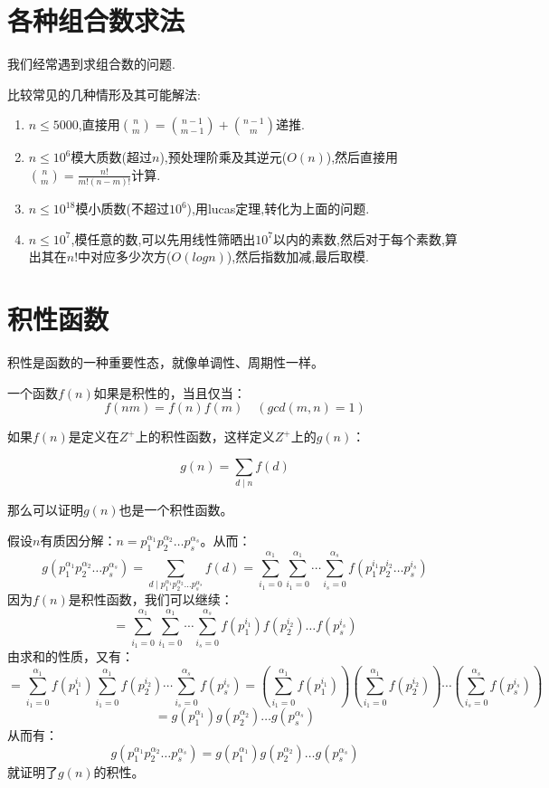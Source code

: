 \documentclass{beamer}
\begin{document}
	\section{各种组合数求法}
		\begin{frame}
			我们经常遇到求组合数的问题.
			
			\pause
			
			比较常见的几种情形及其可能解法:
			\begin{enumerate}
				\item $n \leq 5000$,直接用$\binom{n}{m} = \binom{n-1}{m-1} + \binom{n-1}{m}$递推.
				\item $n \leq 10^6$模大质数(超过$n$),预处理阶乘及其逆元($O(n)$),然后直接用$\binom{n}{m} = \frac{n!}{m!(n-m)!}$计算.
				\item $n \leq 10^{18}$模小质数(不超过$10^6$),用lucas定理,转化为上面的问题.
				\item $n \leq 10^7$,模任意的数,可以先用线性筛晒出$10^7$以内的素数,然后对于每个素数,算出其在$n!$中对应多少次方($O(logn)$),然后指数加减,最后取模.
			\end{enumerate}
		\end{frame}	
	
	\section{积性函数}
		\begin{frame}
				积性是函数的一种重要性态，就像单调性、周期性一样。
				
				一个函数$f(n)$如果是积性的，当且仅当：
				$$
				f(nm) = f(n)f(m) \quad (gcd(m,n) = 1)
				$$
				
				如果$f(n)$是定义在$Z^{+}$上的积性函数，这样定义$Z^{+}$上的$g(n)$：
				
				$$
				g(n) = \sum_{d \mid n} f(d)
				$$
				
				那么可以证明$g(n)$也是一个积性函数。
				
		\end{frame}
		
		\begin{frame}
			
			假设$n$有质因分解：$n = p_1^{\alpha_1}p_2^{\alpha_2}\dots p_s^{\alpha_s}$。从而：
			$$
			g(p_1^{\alpha_1}p_2^{\alpha_2}\dots p_s^{\alpha_s}) = \sum_{d \mid p_1^{\alpha_1}p_2^{\alpha_2}\dots p_s^{\alpha_s}}f(d) = \sum_{i_1 = 0}^{\alpha_1}\sum_{i_1 = 0}^{\alpha_1}\cdots\sum_{i_s = 0}^{\alpha_s}f(p_1^{i_1}p_2^{i_2}\dots p_s^{i_s}) 
			$$
			因为$f(n)$是积性函数，我们可以继续：
			$$
			= \sum_{i_1 = 0}^{\alpha_1}\sum_{i_1 = 0}^{\alpha_1}\cdots\sum_{i_s = 0}^{\alpha_s}f(p_1^{i_1})f(p_2^{i_2})\dots f(p_s^{i_s}) 
			$$
			由求和的性质，又有：
			$$
			= \sum_{i_1 = 0}^{\alpha_1}f(p_1^{i_1})\sum_{i_1 = 0}^{\alpha_1}f(p_2^{i_2})\cdots\sum_{i_s = 0}^{\alpha_s}f(p_s^{i_s}) =  (\sum_{i_1 = 0}^{\alpha_1}f(p_1^{i_1}))(\sum_{i_1 = 0}^{\alpha_1}f(p_2^{i_2}))\cdots(\sum_{i_s = 0}^{\alpha_s}f(p_s^{i_s}))
			$$
			$$
			= g( p_1^{\alpha_1})g(p_2^{\alpha_2})\dots　g(p_s^{\alpha_s})
			$$
			从而有：
			$$
			g(p_1^{\alpha_1}p_2^{\alpha_2}\dots p_s^{\alpha_s}) = g( p_1^{\alpha_1})g(p_2^{\alpha_2})\dots　g(p_s^{\alpha_s})
			$$
			就证明了$g(n)$的积性。
		\end{frame}
	
\end{document}
